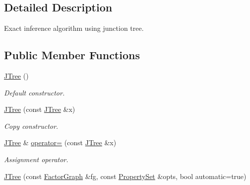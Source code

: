 \subsection{Detailed Description}
Exact inference algorithm using junction tree. \subsection*{Public Member Functions}
\begin{CompactItemize}
\item 
\hypertarget{classdai_1_1JTree_7e4dd4e6f6eaded0600b6759ceccae87}{
\hyperlink{classdai_1_1JTree_7e4dd4e6f6eaded0600b6759ceccae87}{JTree} ()}
\label{classdai_1_1JTree_7e4dd4e6f6eaded0600b6759ceccae87}

\begin{CompactList}\small\item\em Default constructor. \item\end{CompactList}\item 
\hypertarget{classdai_1_1JTree_48999aa576e174177e5f904deaa9699d}{
\hyperlink{classdai_1_1JTree_48999aa576e174177e5f904deaa9699d}{JTree} (const \hyperlink{classdai_1_1JTree}{JTree} \&x)}
\label{classdai_1_1JTree_48999aa576e174177e5f904deaa9699d}

\begin{CompactList}\small\item\em Copy constructor. \item\end{CompactList}\item 
\hypertarget{classdai_1_1JTree_e57eeabbe31424e37ede02ec83d8c89b}{
\hyperlink{classdai_1_1JTree}{JTree} \& \hyperlink{classdai_1_1JTree_e57eeabbe31424e37ede02ec83d8c89b}{operator=} (const \hyperlink{classdai_1_1JTree}{JTree} \&x)}
\label{classdai_1_1JTree_e57eeabbe31424e37ede02ec83d8c89b}

\begin{CompactList}\small\item\em Assignment operator. \item\end{CompactList}\item 
\hypertarget{classdai_1_1JTree_5c81f2500cc196eb50921d7db7794216}{
\hyperlink{classdai_1_1JTree_5c81f2500cc196eb50921d7db7794216}{JTree} (const \hyperlink{classdai_1_1FactorGraph}{FactorGraph} \&fg, const \hyperlink{classdai_1_1PropertySet}{PropertySet} \&opts, bool automatic=true)}
\label{classdai_1_1JTree_5c81f2500cc196eb50921d7db7794216}


\end{CompactItemize}
